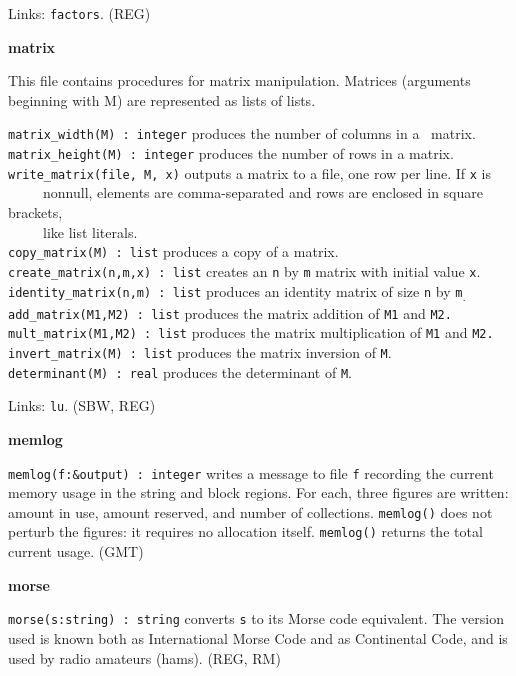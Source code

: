 Links: \texttt{factors}. (REG)

{\sffamily\bfseries
matrix}

This file contains procedures for matrix
manipulation. Matrices (arguments beginning with M) are represented as
lists of lists.

\texttt{matrix\_width(M) : integer} produces the number of columns in a
\ matrix.\\
\texttt{matrix\_height(M) : integer} produces the number of rows in a
matrix.\\
\texttt{write\_matrix(file, M, x)} outputs a matrix to a file, one row
per line. If \texttt{x} is\\
 \ \ \ \ \ nonnull, elements are comma-separated and rows are enclosed
in square brackets,\\
 \ \ \ \ \ like list literals.\\
\texttt{copy\_matrix(M) : list} produces a copy of a matrix.\\
\texttt{create\_matrix(n,m,x) : list} creates an \texttt{n} by
\texttt{m} matrix with initial value \texttt{x}.\\
\texttt{identity\_matrix(n,m) : list} produces an identity matrix of
size \texttt{n} by \texttt{m}\textsubscript{.}\\
\texttt{add\_matrix(M1,M2) : list} produces the matrix addition of
\texttt{M1} and \texttt{M2.}\\
\texttt{mult\_matrix(M1,M2) : list} produces the matrix multiplication
of \texttt{M1} and \texttt{M2.}\\
\texttt{invert\_matrix(M) : list} produces the matrix inversion of
\texttt{M}.\\
\texttt{determinant(M) : real} produces the determinant of \texttt{M}.

Links: \texttt{lu}. (SBW, REG)

{\sffamily\bfseries
memlog}

\texttt{memlog(f:\&output) : integer} writes a message to file
\texttt{f} recording the current memory usage in the string and block
regions. For each, three figures are written: amount in use, amount
reserved, and number of collections. \texttt{memlog()} does not perturb
the figures: it requires no allocation itself. \texttt{memlog()}
returns the total current usage. (GMT)

{\sffamily\bfseries
morse}

\texttt{morse(s:string) : string} converts \texttt{s} to its
Morse code equivalent. The version used is known both
as International Morse Code and as Continental Code, and is used by
radio amateurs (hams). (REG, RM)

